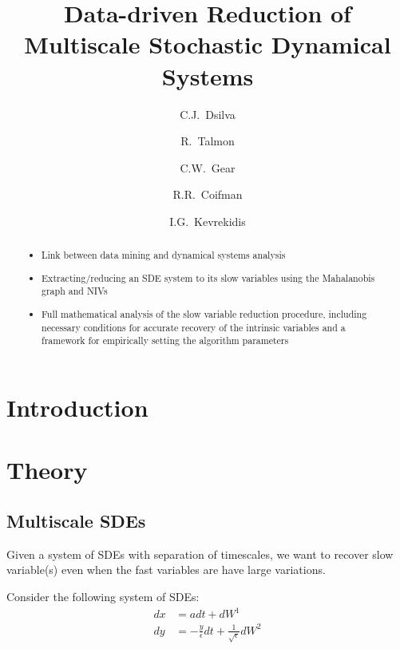 \documentclass[1p]{elsarticle}
\title{Data-driven Reduction of Multiscale Stochastic Dynamical Systems }
\author[PrincetonCBE]{C.J.~Dsilva}
\author[YaleMath]{R.~Talmon}
\author[PrincetonCBE]{C.W.~Gear}
\author[YaleMath]{R.R.~Coifman}
\author[PrincetonCBE, PrincetonPACM]{I.G.~Kevrekidis\corref{cor1}}
\begin{document}
\begin{abstract}

\begin{itemize}

\item Link between data mining and dynamical systems analysis

\item Extracting/reducing an SDE system to its slow variables using the Mahalanobis graph and NIVs

\item Full mathematical analysis of the slow variable reduction procedure, including necessary conditions for accurate recovery of the intrinsic variables and a framework for empirically setting the algorithm parameters

\end{itemize}

\end{abstract}


\begin{keyword}
 
\end{keyword}

\maketitle

\section{Introduction}

\section{Theory}

\subsection{Multiscale SDEs}

Given a system of SDEs with separation of timescales, we want to recover slow variable(s) even when the fast variables are have large variations.

Consider the following system of SDEs:
\begin{equation} \label{eq:fast_slow_SDE}
\begin{aligned}
dx &= adt + dW^1\\
dy &= -\frac{y}{\epsilon} dt + \frac{1}{\sqrt{\epsilon}} dW^2
\end{aligned}
\end{equation}
\end{document}
